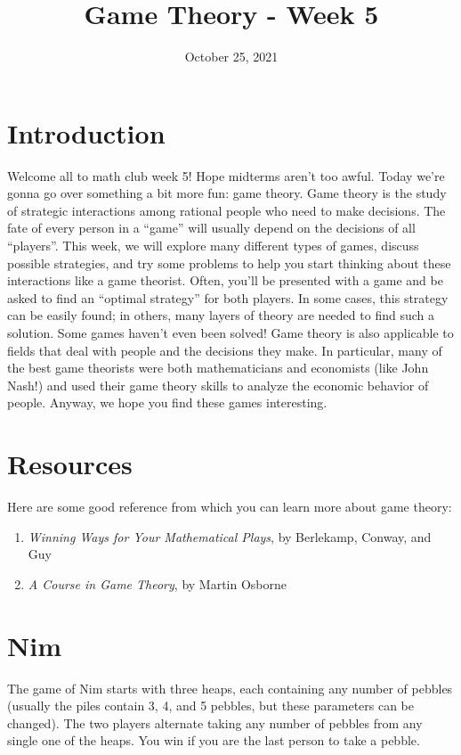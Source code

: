 \documentclass{article}
\title{Game Theory - Week 5}
\author{}
\date{October 25, 2021}
\begin{document}
\section{Introduction}

Welcome all to math club week 5!
Hope midterms aren't too awful.
Today we're gonna go over something a bit more fun: game theory.
Game theory is the study of strategic interactions among rational people who need to make decisions. 
The fate of every person in a ``game'' will usually depend on the decisions of all ``players''.
This week, we will explore many different types of games, discuss possible strategies, and try some problems to help you start thinking about these interactions like a game theorist.
Often, you'll be presented with a game and be asked to find an ``optimal strategy'' for both players.
In some cases, this strategy can be easily found; in others, many layers of theory are needed to find such a solution.
Some games haven't even been solved!
Game theory is also applicable to fields that deal with people and the decisions they make.
In particular, many of the best game theorists were both mathematicians and economists (like John Nash!) and used their game theory skills to analyze the economic behavior of people.
Anyway, we hope you find these games interesting.

\section{Resources}

Here are some good reference from which you can learn more about game theory:
\begin{enumerate}
    \item {\it Winning Ways for Your Mathematical Plays}, by Berlekamp, Conway, and Guy
    \item {\it A Course in Game Theory}, by Martin Osborne
\end{enumerate}

\section{Nim}

The game of Nim starts with three heaps, each containing any number of pebbles (usually the piles contain 3, 4, and 5 pebbles, but these parameters can be changed).
The two players alternate taking any number of pebbles from any single one of the heaps.
You win if you are the last person to take a pebble.
\end{document}
